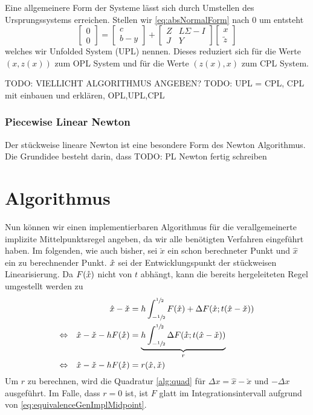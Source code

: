 Eine allgemeinere Form der Systeme lässt sich durch Umstellen des Ursprungssystems erreichen. Stellen wir \eqref{eq:absNormalForm} nach $0$ um entsteht
 \begin{equation}
\label{eq:UPL}
  \begin{bmatrix}
   0\\0
  \end{bmatrix}
  =
  \begin{bmatrix}
   c\\b -y
  \end{bmatrix}
  +
  \begin{bmatrix}
   Z & L\Sigma - I \\
   J & Y
  \end{bmatrix}
  \begin{bmatrix}
   x\\ \tilde z
  \end{bmatrix}
 \end{equation}
welches wir Unfolded System (UPL) nennen. Dieses reduziert sich für die Werte $(x,z(x))$ zum OPL System und für die Werte $(z(x),x)$ zum CPL System.


TODO: VIELLICHT ALGORITHMUS ANGEBEN?
TODO: UPL = CPL, CPL mit einbauen und erklären, OPL,UPL,CPL
\subsubsection{Piecewise Linear Newton}
Der stückweise lineare Newton ist eine besondere Form des Newton Algorithmus. Die Grundidee besteht darin, dass 
TODO: PL Newton fertig schreiben
\section{Algorithmus}
Nun können wir einen implementierbaren Algorithmus für die verallgemeinerte implizite Mittelpunktsregel angeben, da wir alle benötigten Verfahren eingeführt haben. Im folgenden, wie auch bisher, sei $\check x$ ein schon berechneter Punkt und $\hat x$ ein zu berechnender Punkt. $\mathring{x}$ sei der Entwicklungspunkt der stückweisen Linearisierung. Da $F(\mathring{x})$ nicht von $t$ abhängt, kann die bereits hergeleiteten Regel umgestellt werden zu 
\begin{equation}
\label{eq:genMidpointAlg}
\begin{aligned}
 && \hat x - \check x &= h\int_{-\sfrac{1}{2}}^{\sfrac{1}{2}}F(\mathring{x})+ \Delta F(\mathring{x};t(\hat x - \check x)) \\
 \Leftrightarrow && \hat x - \check x - hF(\mathring{x}) & =\underbrace{h \int_{-\sfrac{1}{2}}^{\sfrac{1}{2}} \Delta F(\mathring{x};t(\hat x - \check x))}_{r} \\
 \Leftrightarrow && \hat x - \check x - hF(\mathring{x}) & =r(\hat x,\check x)
\end{aligned}
\end{equation}
Um $r$ zu berechnen, wird die Quadratur \ref{alg:quad} für $\Delta x = \hat x - \check x$ und $-\Delta x$ ausgeführt. Im Falle, dass $r=0$ ist, ist $F$ glatt im Integrationsintervall aufgrund von \eqref{eq:equivalenceGenImplMidpoint}.

